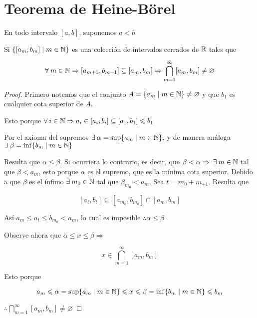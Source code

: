 \section{Teorema de Heine-Börel}

\begin{notation}
    En todo intervalo $[a,b]$, suponemos $a < b$
\end{notation}

\begin{lemma} \label{lemma331}
    Si $\{ [a_m,b_m] \mid m \in \mathbb{N} \}$ es una colección de intervalos cerrados de $\mathbb{R}$ tales que 

    $$\forall \: m \in \mathbb{N} \Rightarrow [a_{m+1},b_{m+1}] \subseteq [a_m,b_m] \Rightarrow \bigcap_{m=1}^{\infty} [a_m,b_m] \neq \varnothing$$
\end{lemma}

\begin{proof}
    Primero notemos que el conjunto $A = \{ a_m \mid m \in \mathbb{N} \} \neq \varnothing$ y que $b_1$ es cualquier cota superior de $A$. 

    Esto porque $\forall \: i \in \mathbb{N} \Rightarrow a_i \in [a_i, b_i] \subseteq [a_1, b_1] \leqslant b_1$

    Por el axioma del supremos $\exists \: \alpha = \sup \{ a_m \mid m \in \mathbb{N} \}$, y de manera análoga  $\exists \: \beta = \inf \{ b_m \mid m \in \mathbb{N} \}$

    Resulta que $\alpha \leqslant \beta$. Si ocurriera lo contrario, es decir, que $\beta < \alpha \Rightarrow \: \exists \: m \in \mathbb{N}$ tal que $\beta < a_m$, esto porque $\alpha$ es el supremo, que es la mínima cota superior. Debido a que $\beta$ es el ínfimo $\exists \: m_0 \in \mathbb{N}$ tal que $\beta_{m_0} < a_m$. Sea $t = m_0 + m_{+1}$. Resulta que

    $$[a_t,b_t] \subseteq [a_{m_0}, b_{m_0}] \cap [a_m, b_m]$$

    Así $a_m \leqslant a_t \leqslant b_{m_0} < a_m$, lo cual es imposible $\therefore \alpha \leqslant \beta$

    Observe ahora que $\alpha \leqslant x \leqslant \beta \Rightarrow$ 

    $$x \in \bigcap_{m=1}^{\infty} [a_m,b_m]$$

    Esto porque

    $$a_m \leqslant  \alpha = \sup \{ a_m \mid m \in \mathbb{N} \} \leqslant x \leqslant  \beta = \inf \{ b_m \mid m \in \mathbb{N} \} \leqslant b_m$$

    $\therefore \bigcap_{m=1}^{\infty} [a_m,b_m] \neq \varnothing$
\end{proof}

